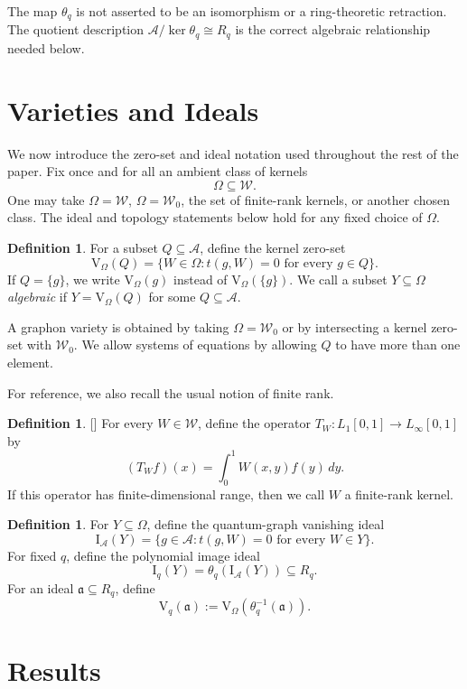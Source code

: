 \documentclass[a4paper,12pt]{article}
\let\cite\parencite
\theoremstyle{definition}
\newtheorem{definition}[lemma]{Definition}
\newcommand\cW{\mathcal{W}}
\newcommand\cA{\mathcal{A}}
\newcommand\V{\mathrm{V}_{\Omega}}
\newcommand\Vq{\mathrm{V}_{q}}
\newcommand\Iq{\mathrm{I}_{q}}
\newcommand\IA{\mathrm{I}_{\cA}}
\newcommand\Rq{R_q}
\newcommand\thetaq{\theta_q}
\begin{document}
The map $\thetaq$ is not asserted to be an isomorphism or a ring-theoretic retraction. The quotient description $\cA/\ker\thetaq\cong\Rq$ is the correct algebraic relationship needed below.

\section{Varieties and Ideals}\label{section: Var and Ideals}

We now introduce the zero-set and ideal notation used throughout the rest of the paper. Fix once and for all an ambient class of kernels
\[
    \Omega\subseteq\cW.
\]
One may take $\Omega=\cW$, $\Omega=\cW_0$, the set of finite-rank kernels, or another chosen class. The ideal and topology statements below hold for any fixed choice of $\Omega$.

\begin{definition}\label{definition: kernel zero set}
For a subset $Q\subseteq\cA$, define the kernel zero-set
\[
    \V(Q)=\{W\in\Omega:t(g,W)=0\text{ for every }g\in Q\}.
\]
If $Q=\{g\}$, we write $\V(g)$ instead of $\V(\{g\})$. We call a subset $Y\subseteq\Omega$ \textit{algebraic} if $Y=\V(Q)$ for some $Q\subseteq\cA$.
\end{definition}

A graphon variety is obtained by taking $\Omega=\cW_0$ or by intersecting a kernel zero-set with $\cW_0$. We allow systems of equations by allowing $Q$ to have more than one element.

For reference, we also recall the usual notion of finite rank.

\begin{definition}\label{definition:finite rank}[\cite{hombook}]
For every $W\in\cW$, define the operator $T_W:L_1[0,1]\to L_\infty[0,1]$ by
\[
    (T_Wf)(x)=\int_0^1 W(x,y)f(y)\,dy.
\]
If this operator has finite-dimensional range, then we call $W$ a finite-rank kernel.
\end{definition}

\begin{definition}\label{definition: ideals}
For $Y\subseteq\Omega$, define the quantum-graph vanishing ideal
\[
    \IA(Y)=\{g\in\cA:t(g,W)=0\text{ for every }W\in Y\}.
\]
For fixed $q$, define the polynomial image ideal
\[
    \Iq(Y)=\thetaq(\IA(Y))\subseteq\Rq.
\]
For an ideal $\mathfrak a\subseteq\Rq$, define
\[
    \Vq(\mathfrak a):=\V(\thetaq^{-1}(\mathfrak a)).
\]
\end{definition}

\section{Results}\label{section: Res}
\end{document}
